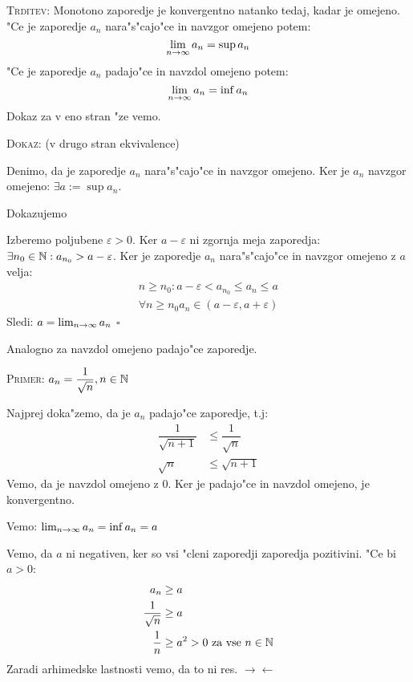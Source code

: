 \textsc{Trditev:} Monotono zaporedje je konvergentno natanko tedaj, kadar je omejeno. "Ce je zaporedje $a_n$ nara"s"cajo"ce in navzgor omejeno potem:
\begin{equation*}
\lim_{n \rightarrow \infty}a_n = \sup a_n
\end{equation*}
"Ce je zaporedje $a_n$ padajo"ce in navzdol omejeno potem:
\begin{equation*}
\lim_{n \rightarrow \infty}a_n = \inf a_n
\end{equation*}
Dokaz za v eno stran "ze vemo.

\textsc{Dokaz: } (v drugo stran ekvivalence)

Denimo, da je zaporedje $a_n$ nara"s"cajo"ce in navzgor omejeno. Ker je $a_n$ navzgor omejeno: $\exists a := \sup a_n$.

Dokazujemo 

Izberemo poljubene $\varepsilon > 0$. Ker $a - \varepsilon$ ni zgornja meja zaporedja: $\exists n_0 \in \mathbb{N}: a_{n_0} > a - \varepsilon$. Ker je zaporedje $a_n$ nara"s"cajo"ce in navzgor omejeno z $a$ velja:
\begin{gather*}
n \geq n_0: a-\varepsilon < a_{n_0} \leq a_n \leq a\\
\forall n \geq n_0 a_n \in (a - \varepsilon, a + \varepsilon)
\end{gather*}
Sledi: $a = \lim_{n \rightarrow \infty}a_n$ \hfill $\square$

Analogno za navzdol omejeno padajo"ce zaporedje.

\textsc{Primer:} $a_n = \dfrac{1}{\sqrt{n}}, n \in \mathbb{N}$

Najprej doka"zemo, da je $a_n$ padajo"ce zaporedje, t.j:
\begin{align*}
\dfrac{1}{\sqrt{n + 1}} &\leq \dfrac{1}{\sqrt{n}} \\
\sqrt{n} &\leq \sqrt{n+1}
\end{align*}
Vemo, da je navzdol omejeno z 0. Ker je padajo"ce in navzdol omejeno, je konvergentno.


Vemo: $\lim_{n \rightarrow \infty} a_n = \inf a_n = a$

Vemo, da $a$ ni negativen, ker so vsi "cleni zaporedji zaporedja pozitivini. "Ce bi $a > 0$:
\begin{align*}
a_n &\geq a\\
\dfrac{1}{\sqrt{n}} &\geq a\\
\dfrac{1}{n} &\geq a^2 > 0 \text{ za vse $n \in \mathbb{N}$}
\end{align*}
Zaradi arhimedske lastnosti vemo, da to ni res. $\rightarrow \leftarrow$


